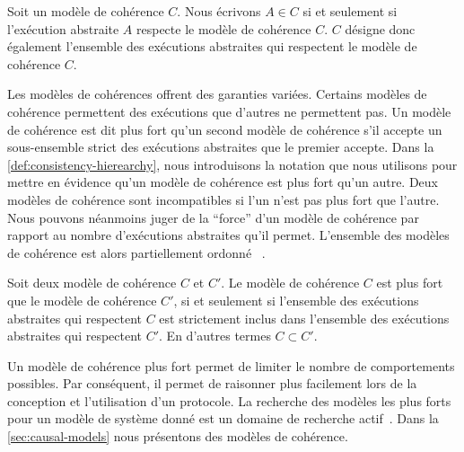 \begin{definition}\label{def:consistency-model}
Soit un modèle de cohérence $C$.
Nous écrivons $A \in C$ si et seulement si l'exécution abstraite $A$ respecte le modèle de cohérence $C$.
$C$ désigne donc également l'ensemble des exécutions abstraites qui respectent le modèle de cohérence $C$.
\end{definition}


Les modèles de cohérences offrent des garanties variées.
Certains modèles de cohérence permettent des exécutions que d'autres ne permettent pas.
Un modèle de cohérence est dit plus fort qu'un second modèle de cohérence s'il accepte un sous-ensemble strict des exécutions abstraites que le premier accepte.
Dans la \autoref{def:consistency-hierearchy}, nous introduisons la notation que nous utilisons pour mettre en évidence qu'un modèle de cohérence est plus fort qu'un autre.
Deux modèles de cohérence sont incompatibles si l'un n'est pas plus fort que l'autre.
Nous pouvons néanmoins juger de la \enquote{force} d'un modèle de cohérence par rapport au nombre d'exécutions abstraites qu'il permet.
L'ensemble des modèles de cohérence est alors partiellement ordonné
~\autocite{viotti_consistency_2016}.

\begin{definition}\label{def:consistency-hierearchy}
Soit deux modèle de cohérence $C$ et $C'$.
Le modèle de cohérence $C$ est plus fort que le modèle de cohérence $C'$, si et seulement si l'ensemble des exécutions abstraites qui respectent $C$ est strictement inclus dans l'ensemble des exécutions abstraites qui respectent $C'$.
En d'autres termes $C \subset C'$.
\end{definition}

Un modèle de cohérence plus fort permet de limiter le nombre de comportements possibles.
Par conséquent, il permet de raisonner plus facilement lors de la conception et l'utilisation d'un protocole.
La recherche des modèles les plus forts pour un modèle de système donné est un domaine de recherche actif~\cite{mahajan_2011_cac,guerraoui_2016_tradeoffs-replication,viotti_consistency_2016}.
Dans la \autoref{sec:causal-models} nous présentons des modèles de cohérence.


